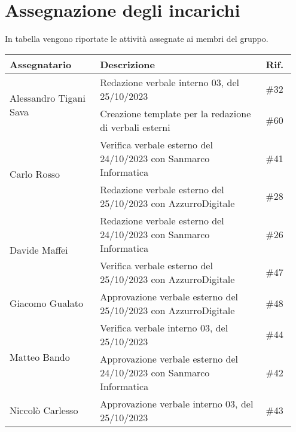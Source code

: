 \section{Assegnazione degli incarichi}
In tabella vengono riportate le attività assegnate ai membri del gruppo.
\begin{center}
    {
    \renewcommand{\arraystretch}{1.5}
    \begin{tabular}{p{0.30\linewidth}|p{0.55\linewidth}|p{0.10\linewidth}}
		\textbf{Assegnatario}   		&   \textbf{Descrizione}   & \textbf{Rif.}     \\
		\hline
		\multirow{2}{*}{Alessandro Tigani Sava}		& Redazione verbale interno 03, del 25/10/2023	& \#32 	\\
		\cline{2-3}
										& Creazione template per la redazione di verbali esterni	& \#60	\\
		\hline
		\multirow{2}{*}{Carlo Rosso}	& Verifica verbale esterno del 24/10/2023 con Sanmarco Informatica      & \#41 	\\
		\cline{2-3}
										& Redazione verbale esterno del 25/10/2023 con AzzurroDigitale	        & \#28 	\\
		\hline
		\multirow{2}{*}{Davide Maffei}	& Redazione verbale esterno del 24/10/2023 con Sanmarco Informatica	    & \#26 	\\
		\cline{2-3}
										& Verifica verbale esterno del 25/10/2023 con AzzurroDigitale           & \#47 	\\
		\hline
		Giacomo Gualato					& Approvazione verbale esterno del 25/10/2023 con AzzurroDigitale	    & \#48 	\\
		\hline
		\multirow{2}{*}{Matteo Bando}	& Verifica verbale interno 03, del 25/10/2023							& \#44 	\\
		\cline{2-3}
										& Approvazione verbale esterno del 24/10/2023 con Sanmarco Informatica	& \#42 	\\
		\hline
		Niccolò Carlesso				& Approvazione verbale interno 03, del 25/10/2023 						& \#43 	\\
    \end{tabular}
    }
\end{center}